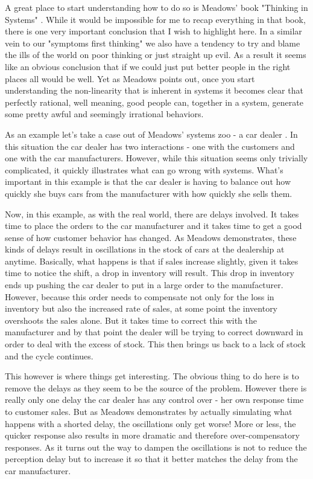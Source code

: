 \documentclass[11pt,a5paper]{book}
\begin{document}
A great place to start understanding how to do so is Meadows' book "Thinking in Systems" \cite{meadows}. While it would be impossible for me to recap everything in that book, there is one very important conclusion that I wish to highlight here. In a similar vein to our "symptoms first thinking" we also have a tendency to try and blame the ills of the world on poor thinking or just straight up evil. As a result it seems like an obvious conclusion that if we could just put better people in the right places all would be well. Yet as Meadows points out, once you start understanding the non-linearity that is inherent in systems it becomes clear that perfectly rational, well meaning, good people can, together in a system, generate some pretty awful and seemingly irrational behaviors. 
\newline 

As an example let's take a case out of Meadows' systems zoo - a car dealer \cite{meadows}. In this situation the car dealer has two interactions - one with the customers and one with the car manufacturers. However, while this situation seems only trivially complicated, it quickly illustrates what can go wrong with systems. What's important in this example is that the car dealer is having to balance out how quickly she buys cars from the manufacturer with how quickly she sells them.
\newline

Now, in this example, as with the real world, there are delays involved. It takes time to place the orders to the car manufacturer and it takes time to get a good sense of how customer behavior has changed. As Meadows demonstrates, these kinds of delays result in oscillations in the stock of cars at the dealership at anytime. Basically, what happens is that if sales increase slightly, given it takes time to notice the shift, a drop in inventory will result. This drop in inventory ends up pushing the car dealer to put in a large order to the manufacturer. However, because this order needs to compensate not only for the loss in inventory but also the increased rate of sales, at some point the inventory overshoots the sales alone. But it takes time to correct this with the manufacturer and by that point the dealer will be trying to correct downward in order to deal with the excess of stock. This then brings us back to a lack of stock and the cycle continues.
\newline

This however is where things get interesting. The obvious thing to do here is to remove the delays as they seem to be the source of the problem. However there is really only one delay the car dealer has any control over - her own response time to customer sales. But as Meadows demonstrates by actually simulating what happens with a shorted delay, the oscillations only get worse! More or less, the quicker response also results in more dramatic and therefore over-compensatory responses. As it turns out the way to dampen the oscillations is not to reduce the perception delay but to increase it so that it better matches the delay from the car manufacturer.
\newline
\end{document}
